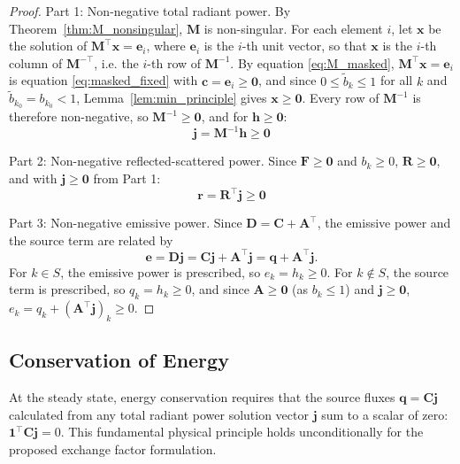 \documentclass[preprint,1p,times]{elsarticle}
\theoremstyle{plain}
\theoremstyle{definition}
\theoremstyle{remark}
\begin{document}
\begin{proof}
Part 1: Non-negative total radiant power.
By Theorem~\ref{thm:M_nonsingular}, $\mathbf{M}$ is non-singular. For each element $i$, let $\mathbf{x}$ be the solution of $\mathbf{M}^\top\mathbf{x} = \mathbf{e}_i$, where $\mathbf{e}_i$ is the $i$-th unit vector, so that $\mathbf{x}$ is the $i$-th column of $\mathbf{M}^{-\top}$, i.e. the $i$-th row of $\mathbf{M}^{-1}$. By equation \eqref{eq:M_masked}, $\mathbf{M}^\top\mathbf{x} = \mathbf{e}_i$ is equation \eqref{eq:masked_fixed} with $\mathbf{c} = \mathbf{e}_i \geq \mathbf{0}$, and since $0 \leq \tilde{b}_k \leq 1$ for all $k$ and $\tilde{b}_{k_0} = b_{k_0} < 1$, Lemma~\ref{lem:min_principle} gives $\mathbf{x} \geq \mathbf{0}$. Every row of $\mathbf{M}^{-1}$ is therefore non-negative, so $\mathbf{M}^{-1} \geq \mathbf{0}$, and for $\mathbf{h} \geq \mathbf{0}$:
\begin{equation}
\mathbf{j} = \mathbf{M}^{-1}\mathbf{h} \geq \mathbf{0}
\end{equation}

Part 2: Non-negative reflected-scattered power.
Since $\mathbf{F} \geq \mathbf{0}$ and $b_k \geq 0$, $\mathbf{R} \geq \mathbf{0}$, and with $\mathbf{j} \geq \mathbf{0}$ from Part 1:
\begin{equation}
\mathbf{r} = \mathbf{R}^\top\mathbf{j} \geq \mathbf{0}
\end{equation}

Part 3: Non-negative emissive power.
Since $\mathbf{D} = \mathbf{C} + \mathbf{A}^\top$, the emissive power and the source term are related by
\begin{equation}
\mathbf{e} = \mathbf{D}\mathbf{j} = \mathbf{C}\mathbf{j} + \mathbf{A}^\top\mathbf{j} = \mathbf{q} + \mathbf{A}^\top\mathbf{j} .
\label{eq:emissive_equivalence}
\end{equation}
For $k \in S$, the emissive power is prescribed, so $e_k = h_k \geq 0$. For $k \notin S$, the source term is prescribed, so $q_k = h_k \geq 0$, and since $\mathbf{A} \geq \mathbf{0}$ (as $b_k \leq 1$) and $\mathbf{j} \geq \mathbf{0}$, $e_k = q_k + (\mathbf{A}^\top\mathbf{j})_k \geq 0$.
\end{proof}

\subsection{Conservation of Energy}

At the steady state, energy conservation requires that the source fluxes $\mathbf{q}=\mathbf{C}\mathbf{j}$ calculated from any total radiant power solution vector $\mathbf{j}$ sum to a scalar of zero: $\mathbf{1}^\top\mathbf{C}\mathbf{j} = 0$. This fundamental physical principle holds unconditionally for the proposed exchange factor formulation.
\end{document}
